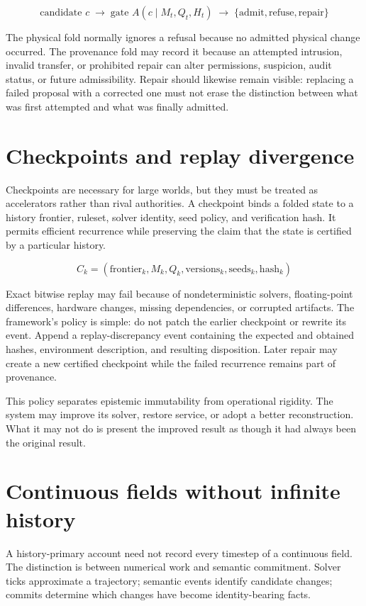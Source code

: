 \documentclass[11pt]{article}
\begin{document}
\[
\text{candidate } c \;\to\; \text{gate } A(c \mid M_t, Q_t, H_t) \;\to\; \{\text{admit}, \text{refuse}, \text{repair}\}
\]

The physical fold normally ignores a refusal because no admitted physical change occurred. The provenance fold may record it because an attempted intrusion, invalid transfer, or prohibited repair can alter permissions, suspicion, audit status, or future admissibility. Repair should likewise remain visible: replacing a failed proposal with a corrected one must not erase the distinction between what was first attempted and what was finally admitted.

\section{Checkpoints and replay divergence}
\label{sec:checkpoints}

Checkpoints are necessary for large worlds, but they must be treated as accelerators rather than rival authorities. A checkpoint binds a folded state to a history frontier, ruleset, solver identity, seed policy, and verification hash. It permits efficient recurrence while preserving the claim that the state is certified by a particular history.

\[
C_k = (\mathrm{frontier}_k, M_k, Q_k, \mathrm{versions}_k, \mathrm{seeds}_k, \mathrm{hash}_k)
\]

Exact bitwise replay may fail because of nondeterministic solvers, floating-point differences, hardware changes, missing dependencies, or corrupted artifacts. The framework's policy is simple: do not patch the earlier checkpoint or rewrite its event. Append a replay-discrepancy event containing the expected and obtained hashes, environment description, and resulting disposition. Later repair may create a new certified checkpoint while the failed recurrence remains part of provenance.

This policy separates epistemic immutability from operational rigidity. The system may improve its solver, restore service, or adopt a better reconstruction. What it may not do is present the improved result as though it had always been the original result.

\section{Continuous fields without infinite history}
\label{sec:continuous}

A history-primary account need not record every timestep of a continuous field. The distinction is between numerical work and semantic commitment. Solver ticks approximate a trajectory; semantic events identify candidate changes; commits determine which changes have become identity-bearing facts.
\end{document}
